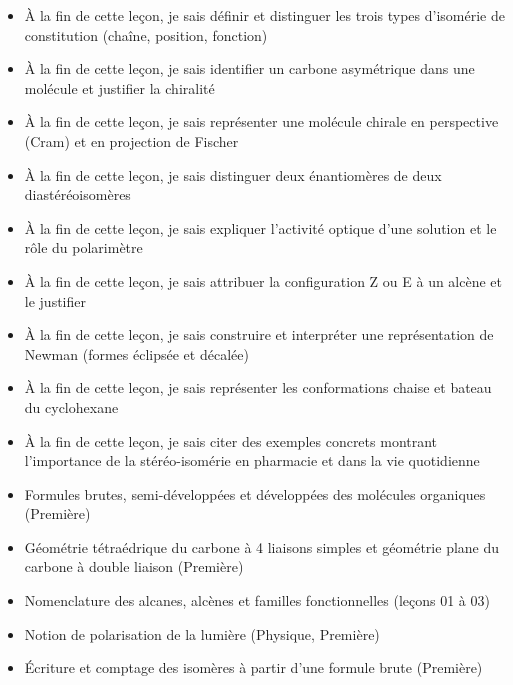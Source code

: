 \documentclass[11pt]{article}
\begin{document}
\begin{objectifs}
\begin{itemize}
\item À la fin de cette leçon, je sais définir et distinguer les trois types d'isomérie de constitution (chaîne, position, fonction)
\item À la fin de cette leçon, je sais identifier un carbone asymétrique dans une molécule et justifier la chiralité
\item À la fin de cette leçon, je sais représenter une molécule chirale en perspective (Cram) et en projection de Fischer
\item À la fin de cette leçon, je sais distinguer deux énantiomères de deux diastéréoisomères
\item À la fin de cette leçon, je sais expliquer l'activité optique d'une solution et le rôle du polarimètre
\item À la fin de cette leçon, je sais attribuer la configuration Z ou E à un alcène et le justifier
\item À la fin de cette leçon, je sais construire et interpréter une représentation de Newman (formes éclipsée et décalée)
\item À la fin de cette leçon, je sais représenter les conformations chaise et bateau du cyclohexane
\item À la fin de cette leçon, je sais citer des exemples concrets montrant l'importance de la stéréo-isomérie en pharmacie et dans la vie quotidienne
\end{itemize}
\end{objectifs}

\begin{prerequis}
\begin{itemize}
\item Formules brutes, semi-développées et développées des molécules organiques (Première)
\item Géométrie tétraédrique du carbone à 4 liaisons simples et géométrie plane du carbone à double liaison (Première)
\item Nomenclature des alcanes, alcènes et familles fonctionnelles (leçons 01 à 03)
\item Notion de polarisation de la lumière (Physique, Première)
\item Écriture et comptage des isomères à partir d'une formule brute (Première)
\end{itemize}
\end{prerequis}

\newpage
\end{document}
